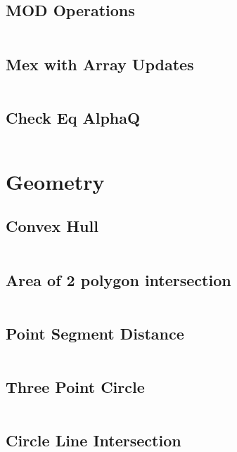 \subsection{\small MOD Operations  \scriptsize}
\inputminted[breaklines, breakanywhere]{c++}{code/11-Misc./16-MOD Operations.cpp}

\subsection{\small Mex with Array Updates  \scriptsize}
\inputminted[breaklines, breakanywhere]{c++}{code/11-Misc./17-Mex with Array Updates.cpp}

\subsection{\small Check Eq AlphaQ  \scriptsize}
\inputminted[breaklines, breakanywhere]{c++}{code/11-Misc./18-Check Eq AlphaQ.cpp}

\section{Geometry}
\subsection{\small Convex Hull  \scriptsize}
\inputminted[breaklines, breakanywhere]{c++}{code/12-Geometry/01-Convex Hull.cpp}

\subsection{\small Area of 2 polygon intersection  \scriptsize}
\inputminted[breaklines, breakanywhere]{c++}{code/12-Geometry/02-Area of 2 polygon intersection.cpp}

\subsection{\small Point Segment Distance  \scriptsize}
\inputminted[breaklines, breakanywhere]{c++}{code/12-Geometry/03-Point Segment Distance.cpp}

\subsection{\small Three Point Circle  \scriptsize}
\inputminted[breaklines, breakanywhere]{c++}{code/12-Geometry/04-Three Point Circle.cpp}

\subsection{\small Circle Line Intersection  \scriptsize}
\inputminted[breaklines, breakanywhere]{c++}{code/12-Geometry/05-Circle Line Intersection.cpp}

